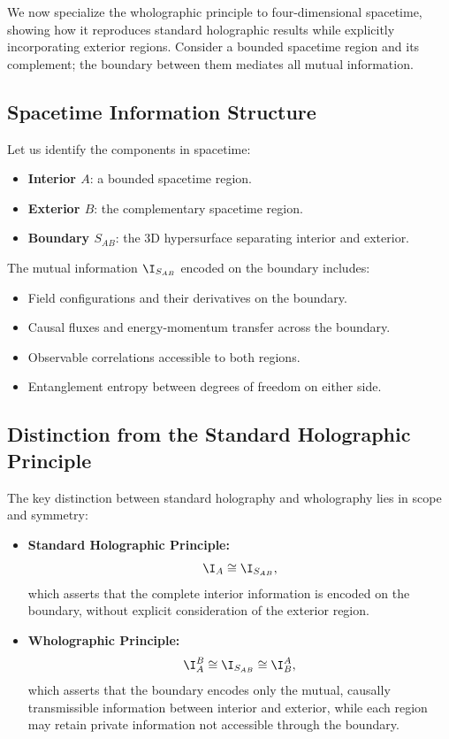 ﻿\documentclass[12pt]{article}
\begin{document}
We now specialize the wholographic principle to four-dimensional spacetime, showing how it reproduces standard holographic results while explicitly incorporating exterior regions. Consider a bounded spacetime region and its complement; the boundary between them mediates all mutual information.


\subsection{Spacetime Information Structure}


Let us identify the components in spacetime:
\begin{itemize}
    \item \textbf{Interior $A$}: a bounded spacetime region.
    \item \textbf{Exterior $B$}: the complementary spacetime region.
    \item \textbf{Boundary $S_{AB}$}: the 3D hypersurface separating interior and exterior.
\end{itemize}


The mutual information $\I_{S_{AB}}$ encoded on the boundary includes:
\begin{itemize}
    \item Field configurations and their derivatives on the boundary.
    \item Causal fluxes and energy-momentum transfer across the boundary.
    \item Observable correlations accessible to both regions.
    \item Entanglement entropy between degrees of freedom on either side.
\end{itemize}


\subsection{Distinction from the Standard Holographic Principle}


The key distinction between standard holography and wholography lies in scope and symmetry:


\begin{itemize}
    \item \textbf{Standard Holographic Principle:}
    \begin{equation}
        \I_{A} \cong \I_{S_{AB}},
    \end{equation}
    which asserts that the complete interior information is encoded on the boundary, without explicit consideration of the exterior region.


    \item \textbf{Wholographic Principle:}
    \begin{equation}
        \I_{A}^{B} \cong \I_{S_{AB}} \cong \I_{B}^{A},
    \end{equation}
    which asserts that the boundary encodes only the mutual, causally transmissible information between interior and exterior, while each region may retain private information not accessible through the boundary.
\end{itemize}
\end{document}
